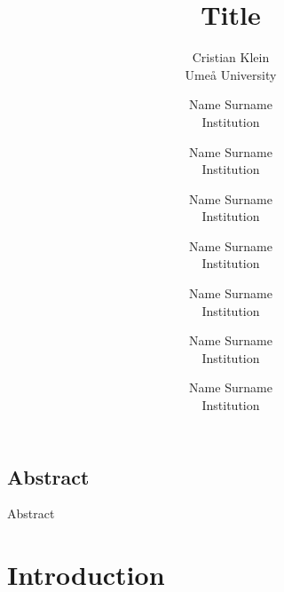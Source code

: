 \documentclass[letterpaper,twocolumn,10pt]{article}
\begin{document}
\date{}
\title{\Large \bf Title}

\author{
{\rm Cristian Klein}\\
Ume{\aa} University
\and
{\rm Name Surname}\\
Institution
\and
{\rm Name Surname}\\
Institution
\and
{\rm Name Surname}\\
Institution
\and
{\rm Name Surname}\\
Institution
\and
{\rm Name Surname}\\
Institution
\and
{\rm Name Surname}\\
Institution
\and
{\rm Name Surname}\\
Institution
} %

\maketitle



\subsection*{Abstract}
Abstract

\section{Introduction}
\label{sec:Introduction}


{\footnotesize 
}
\end{document}
